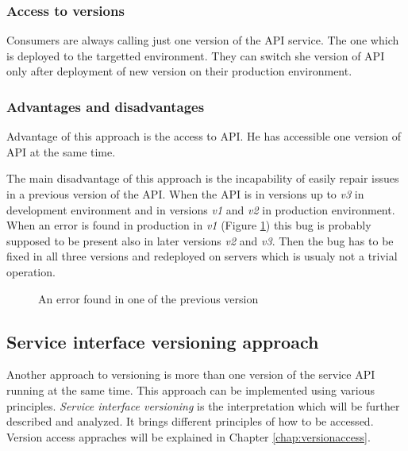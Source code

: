 \subsubsection{Access to versions}
Consumers are always calling just one version of the API service. The one which is deployed to the targetted environment. They can switch she version of API only after deployment of new version on their production environment.

\subsubsection{Advantages and disadvantages}
Advantage of this approach is the access to API. He has accessible one version of API at the same time.

The main disadvantage of this approach is the incapability of easily repair issues in a previous version of the API. When the API is in versions up to \emph{v3} in development environment and in versions \emph{v1} and \emph{v2} in production environment. When an error is found in production in \emph{v1} (Figure \ref{fig:bug-in-previous-version}) this bug is probably supposed to be present also in later versions \emph{v2} and \emph{v3}. Then the bug has to be fixed in all three versions and redeployed on servers which is usualy not a trivial operation.

\begin{figure}[htp] 
\caption{An error found in one of the previous version}
\label{fig:bug-in-previous-version}
\end{figure} 

\bigskip


\subsection{Service interface versioning approach}

Another approach to versioning is more than one version of the service API running at the same time. This approach can be implemented using various principles. \emph{Service interface versioning} is the interpretation which will be further described and analyzed. It brings different principles of how to be accessed. Version access appraches will be explained in Chapter \ref{chap:versionaccess}.

